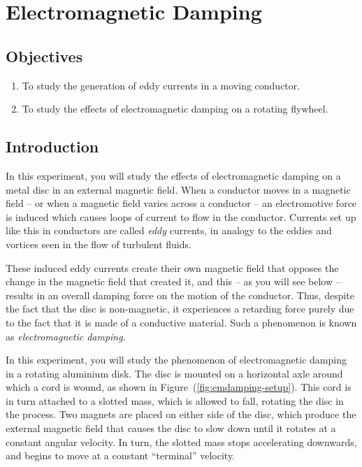 \chapter{Electromagnetic Damping}

\section*{Objectives}

\begin{enumerate}
\itemsep0em
\item To study the generation of eddy currents in a moving conductor.
\item To study the effects of electromagnetic damping on a rotating flywheel.
\end{enumerate}



\section*{Introduction}

In this experiment, you will study the effects of electromagnetic damping on a metal disc in an external magnetic field. When a conductor moves in a magnetic field -- or when a magnetic field varies across a conductor -- an electromotive force is induced which causes loops of current to flow in the conductor. Currents set up like this in conductors are called \textsl{eddy} currents, in analogy to the eddies and vortices seen in the flow of turbulent fluids. 

These induced eddy currents create their own magnetic field that opposes the change in the magnetic field that created it, and this -- as you will see below -- results in an overall damping force on the motion of the conductor. Thus, despite the fact that the disc is non-magnetic, it experiences a retarding force purely due to the fact that it is made of a conductive material. Such a phenomenon is known as \textsl{electromagnetic damping}.

In this experiment, you will study the phenomenon of electromagnetic damping in a rotating aluminium disk. The disc is mounted on a horizontal axle around which a cord is wound, as shown in Figure~(\ref{fig:emdamping-setup}). This cord is in turn attached to a slotted mass, which is allowed to fall, rotating the disc in the process. Two magnets are placed on either side of the disc, which produce the external magnetic field that causes the disc to slow down until it rotates at a constant angular velocity. In turn, the slotted mass stops accelerating downwards, and begins to move at a constant ``terminal'' velocity.

